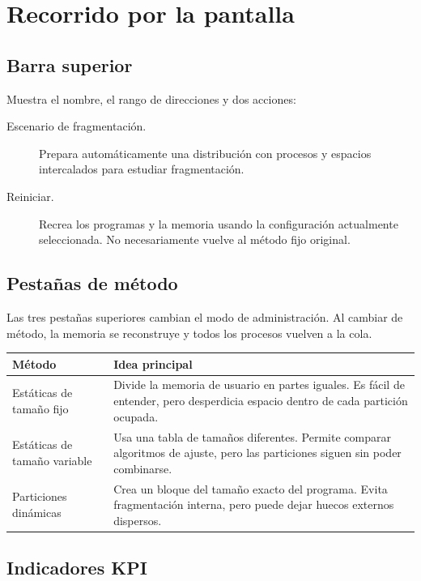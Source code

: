 \documentclass[11pt,a4paper]{article}
\begin{document}
\section{Recorrido por la pantalla}

\subsection{Barra superior}

Muestra el nombre, el rango de direcciones y dos acciones:

\begin{description}
  \item[Escenario de fragmentación.] Prepara automáticamente una distribución con
  procesos y espacios intercalados para estudiar fragmentación.
  \item[Reiniciar.] Recrea los programas y la memoria usando la configuración
  actualmente seleccionada. No necesariamente vuelve al método fijo original.
\end{description}

\subsection{Pestañas de método}

Las tres pestañas superiores cambian el modo de administración. Al cambiar de
método, la memoria se reconstruye y todos los procesos vuelven a la cola.

\begin{longtable}{p{}p{}}
\toprule
\textbf{Método} & \textbf{Idea principal}\\
\midrule
\endhead
Estáticas de tamaño fijo & Divide la memoria de usuario en partes iguales. Es fácil de entender, pero desperdicia espacio dentro de cada partición ocupada.\\
Estáticas de tamaño variable & Usa una tabla de tamaños diferentes. Permite comparar algoritmos de ajuste, pero las particiones siguen sin poder combinarse.\\
Particiones dinámicas & Crea un bloque del tamaño exacto del programa. Evita fragmentación interna, pero puede dejar huecos externos dispersos.\\
\bottomrule
\end{longtable}

\subsection{Indicadores KPI}
\end{document}
